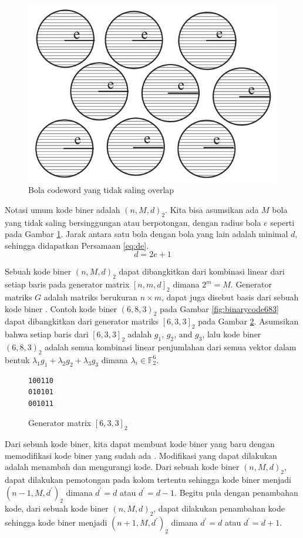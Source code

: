 \begin{figure}
\centering
\includegraphics[scale=0.6]{../img/codewordsball.png}
\caption{Bola codeword yang tidak saling overlap}
\label{fig:codewordsball}
\end{figure}

Notasi umum kode biner adalah $(n,M,d)_2$. Kita bisa asumsikan ada $M$ bola yang tidak saling bersinggungan atau berpotongan, dengan radius bola $e$ seperti pada Gambar \ref{fig:codewordsball}. Jarak antara satu bola dengan bola yang lain adalah minimal $d$, sehingga didapatkan Persamaan \ref{eq:de}.
\begin{equation} \label{eq:de}
d = 2e + 1
\end{equation}

Sebuah kode biner $(n,M,d)_2$ dapat dibangkitkan dari kombinasi linear dari setiap baris pada generator matrix $[n,m,d]_2$ dimana $2^m = M$. Generator matriks $G$ adalah matriks berukuran $n \times m$, dapat juga disebut basis dari sebuah kode biner \cite{VanLint2016}. Contoh kode biner $(6,8,3)_2$ pada Gambar \ref{fig:binarycode683} dapat dibangkitkan dari generator matriks $[6,3,3]_2$ pada Gambar \ref{fig:generator633}. Asumsikan bahwa setiap baris dari $[6,3,3]_2$ adalah $g_1$, $g_2$, and $g_3$, lalu kode biner $(6,8,3)_2$ adalah semua kombinasi linear penjumlahan dari semua vektor dalam bentuk ${\lambda}_1 g_1 + {\lambda}_2 g_2 + {\lambda}_3 g_3$ dimana $\lambda{_i} \in \mathbb{F}_2^6$.

\begin{figure}
\centering
\begin{BVerbatim}
100110
010101
001011
\end{BVerbatim}
\caption{Generator matrix $[6,3,3]_2$}
\label{fig:generator633}
\end{figure}

Dari sebuah kode biner, kita dapat membuat kode biner yang baru dengan memodifikasi kode biner yang sudah ada \cite{Huffman}. Modifikasi yang dapat dilakukan adalah menambah dan mengurangi kode. Dari sebuah kode biner $(n,M,d)_2$, dapat dilakukan pemotongan pada kolom tertentu sehingga kode biner menjadi $(n-1,M,d^\prime)_2$ dimana $d^\prime=d$ atau $d^\prime=d-1$. Begitu pula dengan penambahan kode, dari sebuah kode biner $(n,M,d)_2$, dapat dilakukan penambahan kode sehingga kode biner menjadi $(n+1,M,d^\prime)_2$ dimana $d^\prime=d$ atau $d^\prime=d+1$.
